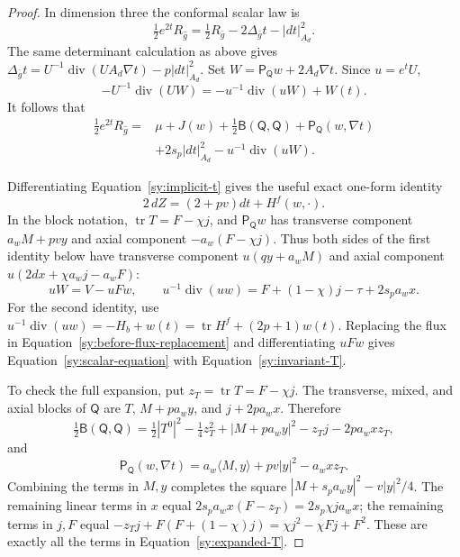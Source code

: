 \begin{proof}
In dimension three the conformal scalar law is
\[
 \tfrac12e^{2t}R_{\widehat g}
 =\tfrac12R_{\bar g}-2\Delta_{\bar g}t-|dt|_{A_d}^2.
\]
The same determinant calculation as above gives
$\Delta_{\bar g}t
=U^{-1}\operatorname{div}(UA_d\nabla t)-p|dt|_{A_d}^2$.
Set $W=\mathsf P_{\mathsf Q}w+2A_d\nabla t$.  Since $u=e^tU$,
\[
 -U^{-1}\operatorname{div}(UW)
 =-u^{-1}\operatorname{div}(uW)+W(t).
\]
It follows that
\begin{equation}\label{sy:before-flux-replacement}
\begin{aligned}
 \tfrac12e^{2t}R_{\widehat g}
 ={}&\mu+J(w)+\tfrac12\mathsf B(\mathsf Q,\mathsf Q)
   +\mathsf P_{\mathsf Q}(w,\nabla t)\\
 &+2s_p|dt|_{A_d}^2-u^{-1}\operatorname{div}(uW).
\end{aligned}
\end{equation}

Differentiating Equation~\ref{sy:implicit-t} gives the useful exact
one-form identity
\begin{equation}\label{sy:differential}
 2\,dZ=(2+pv)dt+H^f(w,\cdot).
\end{equation}
In the block notation, $\operatorname{tr}T=F-\chi j$, and
$\mathsf P_{\mathsf Q}w$ has transverse component
$a_wM+pv y$ and axial component $-a_w(F-\chi j)$.
Thus both sides of the first identity below have transverse component
$u(qy+a_wM)$ and axial component
$u(2dx+\chi a_wj-a_wF)$:
\begin{equation}\label{sy:flux-identities}
 uW=V-uFw,\qquad
 u^{-1}\operatorname{div}(uw)
 =F+(1-\chi)j-\tau+2s_pa_wx.
\end{equation}
For the second identity, use
$u^{-1}\operatorname{div}(uw)=-H_b+w(t)
=\operatorname{tr}H^f+(2p+1)w(t)$.
Replacing the flux in Equation~\ref{sy:before-flux-replacement}
and differentiating $uFw$ gives
Equation~\ref{sy:scalar-equation} with
Equation~\ref{sy:invariant-T}.

To check the full expansion, put $z_T=\operatorname{tr}T=F-\chi j$.
The transverse, mixed, and axial blocks of $\mathsf Q$ are
$T$, $M+pa_wy$, and $j+2pa_wx$.  Therefore
\[
 \tfrac12\mathsf B(\mathsf Q,\mathsf Q)
 =\tfrac12|T^0|^2-\tfrac14z_T^2
   +|M+pa_wy|^2-z_Tj-2pa_wxz_T,
\]
and
\[
 \mathsf P_{\mathsf Q}(w,\nabla t)
 =a_w\langle M,y\rangle+pv|y|^2-a_wxz_T.
\]
Combining the terms in $M,y$ completes the square
$|M+s_pa_wy|^2-v|y|^2/4$.
The remaining linear terms in $x$ equal
$2s_pa_wx(F-z_T)=2s_p\chi ja_wx$;
the remaining terms in $j,F$ equal
$-z_Tj+F(F+(1-\chi)j)=\chi j^2-\chi Fj+F^2$.
These are exactly all the terms in Equation~\ref{sy:expanded-T}.
\end{proof}

